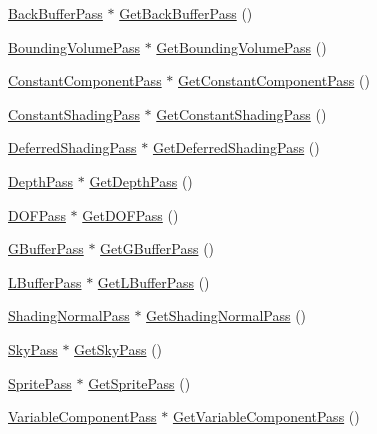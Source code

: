 \begin{DoxyCompactItemize}
\item 
\hyperlink{classmage_1_1_back_buffer_pass}{Back\+Buffer\+Pass} $\ast$ \hyperlink{classmage_1_1_renderer_a94e08d62790b3bfb1a12ae2ae657c5c2}{Get\+Back\+Buffer\+Pass} ()
\item 
\hyperlink{classmage_1_1_bounding_volume_pass}{Bounding\+Volume\+Pass} $\ast$ \hyperlink{classmage_1_1_renderer_a770922853ea48d3f01be5518df8aadb5}{Get\+Bounding\+Volume\+Pass} ()
\item 
\hyperlink{classmage_1_1_constant_component_pass}{Constant\+Component\+Pass} $\ast$ \hyperlink{classmage_1_1_renderer_ae0299628a5475fb8587186a4cacc6a75}{Get\+Constant\+Component\+Pass} ()
\item 
\hyperlink{classmage_1_1_constant_shading_pass}{Constant\+Shading\+Pass} $\ast$ \hyperlink{classmage_1_1_renderer_a190ca65f3a88e4c4e607e0909674a9d9}{Get\+Constant\+Shading\+Pass} ()
\item 
\hyperlink{classmage_1_1_deferred_shading_pass}{Deferred\+Shading\+Pass} $\ast$ \hyperlink{classmage_1_1_renderer_af678bc2be0c501375b448fc95adad131}{Get\+Deferred\+Shading\+Pass} ()
\item 
\hyperlink{classmage_1_1_depth_pass}{Depth\+Pass} $\ast$ \hyperlink{classmage_1_1_renderer_ad73ac769e45eeeb9d293b019be996936}{Get\+Depth\+Pass} ()
\item 
\hyperlink{classmage_1_1_d_o_f_pass}{D\+O\+F\+Pass} $\ast$ \hyperlink{classmage_1_1_renderer_aecc4a5b2b6978ca03796f078c3936423}{Get\+D\+O\+F\+Pass} ()
\item 
\hyperlink{classmage_1_1_g_buffer_pass}{G\+Buffer\+Pass} $\ast$ \hyperlink{classmage_1_1_renderer_a65fbd3dddaf1bff3fc9f53e00c38bb62}{Get\+G\+Buffer\+Pass} ()
\item 
\hyperlink{classmage_1_1_l_buffer_pass}{L\+Buffer\+Pass} $\ast$ \hyperlink{classmage_1_1_renderer_a6b43c7342a017282e5f9f14ac581ea2b}{Get\+L\+Buffer\+Pass} ()
\item 
\hyperlink{classmage_1_1_shading_normal_pass}{Shading\+Normal\+Pass} $\ast$ \hyperlink{classmage_1_1_renderer_a57e18039593423628715375e7a1b1163}{Get\+Shading\+Normal\+Pass} ()
\item 
\hyperlink{classmage_1_1_sky_pass}{Sky\+Pass} $\ast$ \hyperlink{classmage_1_1_renderer_ad81ae84e11337dc699d4c6fb2d367e4d}{Get\+Sky\+Pass} ()
\item 
\hyperlink{classmage_1_1_sprite_pass}{Sprite\+Pass} $\ast$ \hyperlink{classmage_1_1_renderer_ada671ebf46487d88c326657a43184117}{Get\+Sprite\+Pass} ()
\item 
\hyperlink{classmage_1_1_variable_component_pass}{Variable\+Component\+Pass} $\ast$ \hyperlink{classmage_1_1_renderer_abc9ee209c84f87d3186b4390162b9be1}{Get\+Variable\+Component\+Pass} ()

\end{DoxyCompactItemize}
